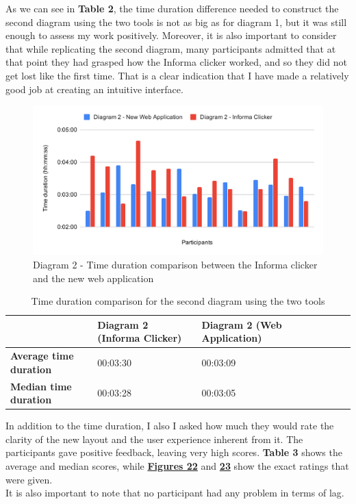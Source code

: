 \documentclass[]{usiinfbachelorproject}
\begin{document}
\noindent As we can see in \textbf{Table 2}, the time duration difference needed to construct the second diagram using the two tools is not as big as for diagram 1, but it was still enough to assess my work positively. Moreover, it is also important to consider that while replicating the second diagram, many participants admitted that at that point they had grasped how the Informa clicker worked, and so they did not get lost like the first time. That is a clear indication that I have made a relatively good job at creating an intuitive interface.

\begin{figure}[h!]
\centering
\includegraphics[scale=0.6]{figures/diagram2-time-comparison.png}
\caption {Diagram 2 - Time duration comparison between the Informa clicker and the new web application}
\end{figure}

\begin{table}[h!]
\centering
\begin{tabular}{|l|l|l|l|l|l|l|}
\hline
 & \textbf{Diagram 2 (Informa Clicker)} & \textbf{Diagram 2 (Web Application)} \\ \hline
\textbf{Average time duration} & 00:03:30 & 00:03:09 \\ \hline
\textbf{Median time duration} & 00:03:28 & 00:03:05 \\ \hline
\end{tabular}
\caption{Time duration comparison for the second diagram using the two tools}
\end{table}

\vspace{\fill}
\pagebreak

\noindent In addition to the time duration, I also I asked how much they would rate the clarity of the new layout and the user experience inherent from it. The participants gave positive feedback, leaving very high scores. \textbf{Table 3} shows the average and median scores, while \hyperref[clarity]{\textbf{Figures 22}} and \hyperref[ux-ratings]{\textbf{23}} show the exact ratings that were given.\\
It is also important to note that no participant had any problem in terms of lag.
\end{document}
